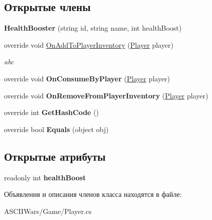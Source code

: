 \subsection*{Открытые члены}
\begin{DoxyCompactItemize}
\item 
\hypertarget{class_a_s_c_i_i_wars_1_1_game_1_1_health_booster_ac7796979395fc12db8b4a8d9a9ba7d7e}{}\label{class_a_s_c_i_i_wars_1_1_game_1_1_health_booster_ac7796979395fc12db8b4a8d9a9ba7d7e} 
{\bfseries Health\+Booster} (string id, string name, int health\+Boost)
\item 
\hypertarget{class_a_s_c_i_i_wars_1_1_game_1_1_health_booster_a99740fd21f80211f6a2058737b159425}{}\label{class_a_s_c_i_i_wars_1_1_game_1_1_health_booster_a99740fd21f80211f6a2058737b159425} 
override void \hyperlink{class_a_s_c_i_i_wars_1_1_game_1_1_health_booster_a99740fd21f80211f6a2058737b159425}{On\+Add\+To\+Player\+Inventory} (\hyperlink{class_a_s_c_i_i_wars_1_1_game_1_1_player}{Player} player)
\begin{DoxyCompactList}\small\item\em abc \end{DoxyCompactList}\item 
\hypertarget{class_a_s_c_i_i_wars_1_1_game_1_1_health_booster_a0dd6134e102b2b4ea9d143b7cea15568}{}\label{class_a_s_c_i_i_wars_1_1_game_1_1_health_booster_a0dd6134e102b2b4ea9d143b7cea15568} 
override void {\bfseries On\+Consume\+By\+Player} (\hyperlink{class_a_s_c_i_i_wars_1_1_game_1_1_player}{Player} player)
\item 
\hypertarget{class_a_s_c_i_i_wars_1_1_game_1_1_health_booster_ae06407b04a0e81da31c14c546d6aaaaf}{}\label{class_a_s_c_i_i_wars_1_1_game_1_1_health_booster_ae06407b04a0e81da31c14c546d6aaaaf} 
override void {\bfseries On\+Remove\+From\+Player\+Inventory} (\hyperlink{class_a_s_c_i_i_wars_1_1_game_1_1_player}{Player} player)
\item 
\hypertarget{class_a_s_c_i_i_wars_1_1_game_1_1_health_booster_a79fdb10389338ad400f723a76ce30d7d}{}\label{class_a_s_c_i_i_wars_1_1_game_1_1_health_booster_a79fdb10389338ad400f723a76ce30d7d} 
override int {\bfseries Get\+Hash\+Code} ()
\item 
\hypertarget{class_a_s_c_i_i_wars_1_1_game_1_1_health_booster_a5396e7ebb46c32e36fefeb86ab4727d3}{}\label{class_a_s_c_i_i_wars_1_1_game_1_1_health_booster_a5396e7ebb46c32e36fefeb86ab4727d3} 
override bool {\bfseries Equals} (object obj)
\end{DoxyCompactItemize}
\subsection*{Открытые атрибуты}
\begin{DoxyCompactItemize}
\item 
\hypertarget{class_a_s_c_i_i_wars_1_1_game_1_1_health_booster_abd6f83cc8e561198c5939ba4a20fd826}{}\label{class_a_s_c_i_i_wars_1_1_game_1_1_health_booster_abd6f83cc8e561198c5939ba4a20fd826} 
readonly int {\bfseries health\+Boost}
\end{DoxyCompactItemize}


Объявления и описания членов класса находятся в файле\+:\begin{DoxyCompactItemize}
\item 
A\+S\+C\+I\+I\+Wars/\+Game/Player.\+cs\end{DoxyCompactItemize}

